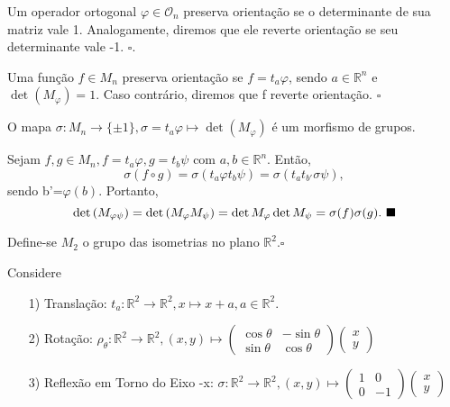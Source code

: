 \documentclass[algebra_notes.tex]{subfiles}
\begin{document}
\begin{def*}
	Um operador ortogonal $\varphi \in \mathcal{O}_{n}$ preserva orientação se o determinante de sua matriz vale 1. Analogamente,
	diremos que ele reverte orientação se seu determinante vale -1. $\square$.
\end{def*}
\begin{def*}
	Uma função $f\in M_{n}$ preserva orientação se $f=t_{a}\varphi $, sendo $a\in \mathbb{R}^{n}$ e $\det{(M_{\varphi })} = 1.$
	Caso contrário, diremos que f reverte orientação. $\square$
\end{def*}
\begin{lemma*}
	O mapa $\sigma :M_{n}\rightarrow \{\pm1\}, \sigma =t_{a}\varphi\mapsto \det{(M_{\varphi })}$ é um morfismo de grupos.
\end{lemma*}
\begin{proof*}
	Sejam $f, g\in M_{n}, f = t_{a}\varphi , g = t_{b}\psi$ com $a, b\in \mathbb{R}^{n}$. Então,
	$$
		\sigma (f\circ{}g) = \sigma (t_{a}\varphi t_{b}\psi) = \sigma (t_{a}t_{b'}\sigma \psi),
	$$
	sendo b'=$\varphi (b).$ Portanto,
	$$
		\det{(M_{\varphi \psi})} = \det{(M_{\varphi }M_{\psi})} = \det{M_{\varphi }}\det{M_{\psi}}=\sigma (f)\sigma (g).\text{ $\blacksquare$}
	$$
\end{proof*}
\begin{def*}
	Define-se $M_{2}$ o grupo das isometrias no plano $\mathbb{R}^{2}.\square$
\end{def*}
Considere
\begin{itemize}
	\item[1)] Translação: $t_{a}:\mathbb{R}^{2}\rightarrow \mathbb{R}^{2}, x\mapsto x+a, a\in \mathbb{R}^{2}.$
	\item[2)] Rotação: $\rho_{\theta }:\mathbb{R}^{2}\rightarrow \mathbb{R}^{2}, (x,y)\mapsto \begin{pmatrix}
			      \cos{\theta } & -\sin{\theta } \\
			      \sin{\theta } & \cos{\theta }
		      \end{pmatrix} \begin{pmatrix}
			      x \\
			      y
		      \end{pmatrix}$
	\item[3)] Reflexão em Torno do Eixo -x: $\sigma :\mathbb{R}^{2}\rightarrow \mathbb{R}^{2}, (x,y)\mapsto \begin{pmatrix}
			      1 & 0  \\
			      0 & -1
		      \end{pmatrix}\begin{pmatrix}
			      x \\
			      y
		      \end{pmatrix}$
\end{itemize}
\end{document}
